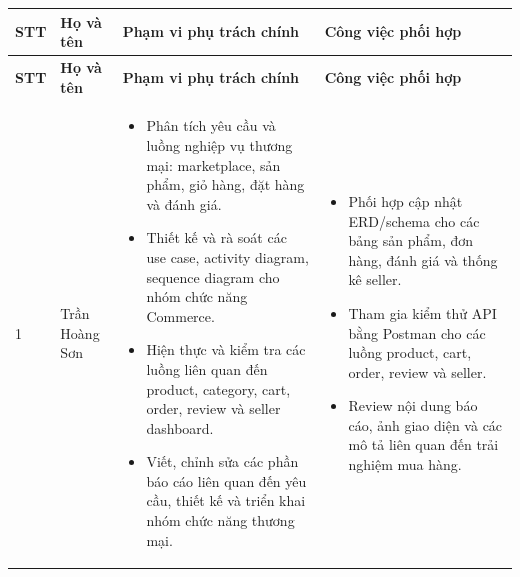 {\small
\setlength{\tabcolsep}{4pt}
\renewcommand{\arraystretch}{1.12}
\setlength{\LTleft}{0pt}
\setlength{\LTright}{0pt}
\begin{longtable}{|>{\centering\arraybackslash}p{}|>{\raggedright\arraybackslash}p{}|>{\raggedright\arraybackslash}p{}|>{\raggedright\arraybackslash}p{}|}
\hline
\textbf{STT} & \textbf{Họ và tên} & \textbf{Phạm vi phụ trách chính} & \textbf{Công việc phối hợp} \\
\hline
\endfirsthead

\hline
\textbf{STT} & \textbf{Họ và tên} & \textbf{Phạm vi phụ trách chính} & \textbf{Công việc phối hợp} \\
\hline
\endhead

\hline
\endfoot

\hline
\endlastfoot

1 & Trần Hoàng Sơn &
\begin{itemize}
    \item Phân tích yêu cầu và luồng nghiệp vụ thương mại: marketplace, sản phẩm, giỏ hàng, đặt hàng và đánh giá.
    \item Thiết kế và rà soát các use case, activity diagram, sequence diagram cho nhóm chức năng Commerce.
    \item Hiện thực và kiểm tra các luồng liên quan đến product, category, cart, order, review và seller dashboard.
    \item Viết, chỉnh sửa các phần báo cáo liên quan đến yêu cầu, thiết kế và triển khai nhóm chức năng thương mại.
\end{itemize}
&
\begin{itemize}
    \item Phối hợp cập nhật ERD/schema cho các bảng sản phẩm, đơn hàng, đánh giá và thống kê seller.
    \item Tham gia kiểm thử API bằng Postman cho các luồng product, cart, order, review và seller.
    \item Review nội dung báo cáo, ảnh giao diện và các mô tả liên quan đến trải nghiệm mua hàng.
\end{itemize}
\\
\hline


\end{longtable}}
